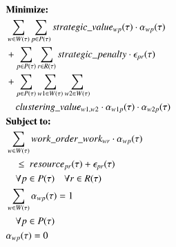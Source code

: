 \begin{alignat}{2}
	& \textbf{Minimize:} \notag\\
	& \sum_{\ElementWorkOrder \in \SetWorkOrder{}} \sum_{\ElementPeriod \in \SetPeriod} \ParStrategicValue \cdot \VarStrategicWorkOrderAssignment{\ElementWorkOrder}{\ElementPeriod}                                                                                      \\ 
	& + \sum_{\ElementPeriod \in \SetPeriod} \sum_{\ElementResource \in \SetResource} \ParStrategicPenalty \cdot \VarStrategicExcess                                                                                                                                  \\
	& + \sum_{\ElementPeriod \in \SetPeriod} \sum_{\ElementWorkOrder1 \in \SetWorkOrder{}} \sum_{\ElementWorkOrder2 \in \SetWorkOrder{}} \notag\\ 
	& \quad \ParClusteringValue \cdot \VarStrategicWorkOrderAssignment{\ElementWorkOrder1}{\ElementPeriod} \cdot \VarStrategicWorkOrderAssignment{\ElementWorkOrder2}{\ElementPeriod}                                                                                 \label{eqn:objective_function_strategic} \\
	& \textbf{Subject to:} \notag                                                                                                                                                                                      \\
	& \sum_{\ElementWorkOrder \in \SetWorkOrder{}} \ParStrategicWorkOrderWeight \cdot \VarStrategicWorkOrderAssignment{\ElementWorkOrder}{\ElementPeriod} \notag \\ 
	& \quad \leq \ \ParStrategicResource + \VarStrategicExcess \notag                                                                       \\ 
	& \quad \forall \ElementPeriod \in \SetPeriod \quad \forall \ElementResource \in \SetResource                                                                                                                  \label{eqn:capacity_constraint}          \\
	& \sum_{\ElementWorkOrder \in \SetWorkOrder{}} \VarStrategicWorkOrderAssignment{\ElementWorkOrder}{\ElementPeriod} = 1 \notag\\
	& \quad \forall \ElementPeriod \in \SetPeriod                      \label{eqn:single_workorder_constraint}  \\
	& \VarStrategicWorkOrderAssignment{\ElementWorkOrder}{\ElementPeriod} = 0 \notag\\

\end{alignat}
